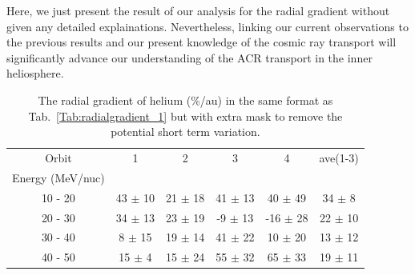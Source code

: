 Here, we just present the result of our analysis for the radial gradient without given any detailed explainations. Nevertheless, linking our current observations to the previous results and our present knowledge of the cosmic ray transport will significantly advance our understanding of the \ac{ACR} transport in the inner heliosphere.




\begin{table}[!htb]
    \centering

    \begin{tabular}{|c|c|c|c|c|c|}
    \hline
    Orbit   & 1                 & 2              & 3               & 4  & ave(1-3)\\
    Energy (MeV/nuc)  &         &                &                 &    &        \\  
    \hline
    10 - 20 &  43 $\pm$ 10 & 21 $\pm$ 18 & 41 $\pm$ 13 & 40 $\pm$ 49  & 34 $\pm$ 8\\
    \hline
    20 - 30 &  34 $\pm$ 13 & 23 $\pm$ 19 & -9 $\pm$ 13 & -16 $\pm$ 28  & 22 $\pm$ 10\\
    \hline
    30 - 40 &  8 $\pm$ 15 & 19 $\pm$ 14 & 41 $\pm$ 22 & 10 $\pm$ 20 & 13 $\pm$ 12\\
    \hline
    40 - 50 &  15 $\pm$ 4 & 15 $\pm$ 24 & 55 $\pm$ 32 & 65 $\pm$ 33 & 19 $\pm$ 11\\
    \hline
    \end{tabular}
    \caption[Table of helium radial gradient with extra mask]{The radial gradient of helium (\%/au) in the same format as Tab.~\ref{Tab:radialgradient_1} but with extra mask to remove the potential short term variation. }
    \label{Tab:radialgradient_2}
\end{table}











%
